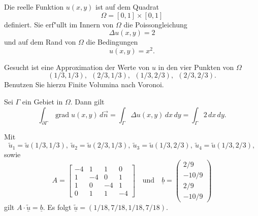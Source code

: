 Die reelle Funktion $u(x,y)$ ist auf dem Quadrat
\[
\Omega = [0, 1] \times [0,1]
\]
definiert.
Sie erf"ullt im Innern von $\Omega$ die Poissongleichung
\[
\Delta u(x,y) = 2
\]
und auf dem Rand von $\Omega$ die Bedingungen
\[
u(x,y) = x^2.
\]

Gesucht ist eine Approximation der Werte von $u$ in den vier Punkten von
$\Omega$
\[
(1/3,1/3), \ \  (2/3,1/3), \ \ (1/3,2/3), \ \  (2/3,2/3).
\]
Benutzen Sie hierzu Finite Volumina nach Voronoi.  

\begin{hinweis}
Sei $\Gamma$ ein Gebiet in $\Omega$.
Dann gilt
\[
\int_{\partial \Gamma} \operatorname{grad} u(x,y) \,d\vec n
=
\int_{\Gamma} \Delta u(x,y) \,dx\,dy
=
\int_{\Gamma} 2 \,dx\, dy.
\]
\end{hinweis}


\begin{loesung}
Mit 
\[
\tilde u_1 = \tilde u(1/3,1/3),
\ \tilde u_2 = \tilde u(2/3,1/3),
\ \tilde u_3 = \tilde u(1/3,2/3),
\ \tilde u_4 = \tilde u(1/3,2/3),
\]
sowie 
\[
A = \left[\begin{array}{rrrr} 
-4 & 1  & 1 & 0 \\
 1 & -4 & 0 & 1 \\
 1 & 0 & -4 & 1 \\ 
 0 & 1 & 1  & -4 \end{array}\right]
\quad\text{und}\quad
\underline{b} =  \left(\begin{array}{r} 2/9 \\ -10/9 \\ 2/9 \\ -10/9 \end{array}\right)
\]
gilt $A \cdot \underline{\tilde u} = \underline{b}.$
Es folgt $\underline{\tilde u} = (1/18, 7/18, 1/18, 7/18).$
\end{loesung}

